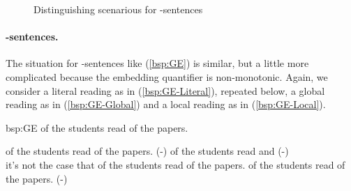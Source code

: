 \documentclass[fleqn,reqno,10pt,draft]{article}
\newcommand{\lit}{\acro{lit}}
\newcommand{\glb}{\acro{glb}}
\newcommand{\loc}{\acro{loc}}
\newcommand{\as}{\acro{as}}
\renewcommand{\es}{\acro{es}}
\begin{document}
\begin{figure}[]
{



}

  \caption{Distinguishing scenarious for \as-sentences}
  \label{fig:AS-distinguishing-pics}
\end{figure}


\paragraph{\es-sentences.}

The situation for \es-sentences like (\ref{bsp:GE}) is similar, but a
little more complicated because the embedding quantifier is
non-monotonic. Again, we consider a literal reading as in
(\ref{bsp:GE-Literal}), repeated below, a global reading as in
(\ref{bsp:GE-Global}) and a local reading as in (\ref{bsp:GE-Local}).

\begin{exer}{bsp:GE}
\ex {} of the students read {} of the
  papers.

  \begin{xlist}
  \ex {} of the students read
    {} of the papers. \hfill (\es-\lit)
  \ex 
     of the students read  
    and  \hfill (\es-\glb)\\
    it's not the case that  of the students read  of the papers.
  \ex 
     of the students read {} of the
    papers. \hfill (\es-\loc)
  \end{xlist}
\end{exer}
\end{document}

